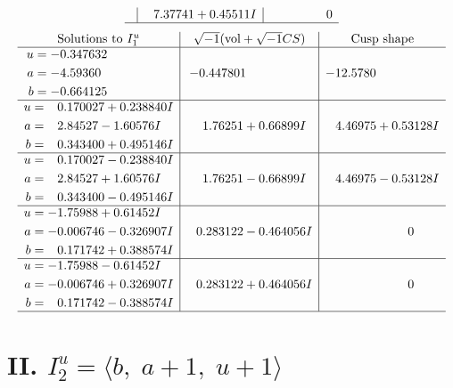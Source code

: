 \documentclass[1p]{elsarticle_modified}
\theoremstyle{definition}
\newcommand{\I}{\sqrt{-1}}
\begin{document}
$$\begin{array}{c|c|c}
 & \phantom{-}7.37741 + 0.45511 I & \phantom{-0.000000 } 0\\
 \hline 
 \end{array}$$\newpage$$\begin{array}{c|c|c}  
\text{Solutions to }I^u_{1}& \I (\text{vol} + \sqrt{-1}CS) & \text{Cusp shape}\\
 \hline 
\begin{aligned}
u &= -0.347632\phantom{ +0.000000I} \\
a &= -4.59360\phantom{ +0.000000I} \\
b &= -0.664125\phantom{ +0.000000I}\end{aligned}
 & -0.447801\phantom{ +0.000000I} & -12.5780\phantom{ +0.000000I} \\ \hline\begin{aligned}
u &= \phantom{-}0.170027 + 0.238840 I \\
a &= \phantom{-}2.84527 - 1.60576 I \\
b &= \phantom{-}0.343400 + 0.495146 I\end{aligned}
 & \phantom{-}1.76251 + 0.66899 I & \phantom{-}4.46975 + 0.53128 I \\ \hline\begin{aligned}
u &= \phantom{-}0.170027 - 0.238840 I \\
a &= \phantom{-}2.84527 + 1.60576 I \\
b &= \phantom{-}0.343400 - 0.495146 I\end{aligned}
 & \phantom{-}1.76251 - 0.66899 I & \phantom{-}4.46975 - 0.53128 I \\ \hline\begin{aligned}
u &= -1.75988 + 0.61452 I \\
a &= -0.006746 - 0.326907 I \\
b &= \phantom{-}0.171742 + 0.388574 I\end{aligned}
 & \phantom{-}0.283122 - 0.464056 I & \phantom{-0.000000 } 0 \\ \hline\begin{aligned}
u &= -1.75988 - 0.61452 I \\
a &= -0.006746 + 0.326907 I \\
b &= \phantom{-}0.171742 - 0.388574 I\end{aligned}
 & \phantom{-}0.283122 + 0.464056 I & \phantom{-0.000000 } 0\\
 \hline 
 \end{array}$$\newpage\newpage\renewcommand{\arraystretch}{1}
\centering \section*{II. $I^u_{2}= \langle b,\;a+1,\;u+1 \rangle$}
\end{document}
